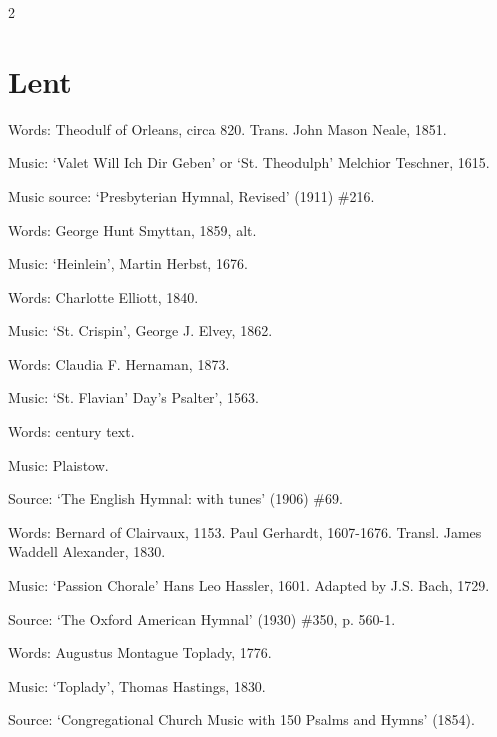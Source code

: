 \begin{multicols}{2}
\section*{Lent}
\par\noindent
Words: Theodulf of Orleans, circa 820. Trans. John Mason Neale, 1851.  
\par\noindent
Music: `Valet Will Ich Dir Geben' or `St. Theodulph' Melchior Teschner, 1615. 
\par\noindent
Music source: `Presbyterian Hymnal, Revised' (1911) \#216.


\par\noindent
Words: George Hunt Smyttan, 1859, alt.
\par\noindent
Music: `Heinlein', Martin Herbst, 1676.


\par\noindent
Words: Charlotte Elliott, 1840.
\par\noindent
Music: `St. Crispin', George J. Elvey, 1862.


\par\noindent
Words: Claudia F. Hernaman, 1873.
\par\noindent
Music: `St. Flavian' Day's Psalter', 1563. 


\par\noindent
Words:  century text. 
\par\noindent
Music: Plaistow.
\par\noindent
Source: `The English Hymnal: with tunes' (1906) \#69.


\par\noindent
Words: Bernard of Clairvaux, 1153. Paul Gerhardt, 1607-1676. Transl. James Waddell Alexander, 1830. 
\par\noindent
Music: `Passion Chorale' Hans Leo Hassler, 1601. Adapted by J.S. Bach, 1729.
\par\noindent
Source: `The Oxford American Hymnal‎' (1930) \#350, p. 560-1.


\par\noindent
Words: Augustus Montague Toplady, 1776. 
\par\noindent
Music: `Toplady', Thomas Hastings, 1830. 
\par\noindent
Source: `Congregational Church Music with 150 Psalms and Hymns' (1854).



\end{multicols}
